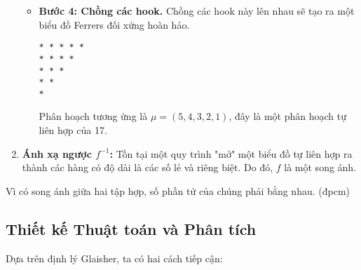 \documentclass[a4paper,12pt]{article}
\begin{document}
\begin{enumerate}
\begin{itemize}
        \item \textbf{Bước 4: Chồng các hook.} Chồng các hook này lên nhau sẽ tạo ra một biểu đồ Ferrers đối xứng hoàn hảo.
        \begin{center}
        \begin{lstlisting}[basicstyle=\ttfamily, numbers=none]
* * * * *
* * * *
* * *
* *
*
        \end{lstlisting}
        \end{center}
        Phân hoạch tương ứng là $\mu = (5, 4, 3, 2, 1)$, đây là một phân hoạch tự liên hợp của 17.
    \end{itemize}
    \item \textbf{Ánh xạ ngược $f^{-1}$:} Tồn tại một quy trình "mở" một biểu đồ tự liên hợp ra thành các hàng có độ dài là các số lẻ và riêng biệt. Do đó, $f$ là một song ánh.
\end{enumerate}
Vì có song ánh giữa hai tập hợp, số phần tử của chúng phải bằng nhau. (đpcm)

\subsection{Thiết kế Thuật toán và Phân tích}
Dựa trên định lý Glaisher, ta có hai cách tiếp cận:
\end{document}
